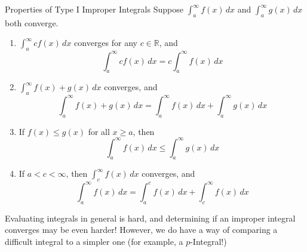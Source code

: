 \begin{Theorem}{Properties of Type I Improper Integrals}{}
    Suppose $ \int_{a}^{\infty} f(x)\, d{x}  $ and $ \int_{a}^{\infty} g(x)\, d{x}  $
    both converge.
    \begin{enumerate}[label=(\arabic*)]
        \item $ \int_{a}^{\infty} cf(x)\, d{x} $
              converges for any $ c\in\mathbb{R} $, and
              \[ \int_{a}^{\infty} cf(x)\, d{x} =c \int_{a}^{\infty} f(x)\, d{x} \]
        \item $ \int_{a}^{\infty} f(x)+g(x)\, d{x} $
              converges, and
              \[ \int_{a}^{\infty} f(x)+g(x)\, d{x}=
                  \int_{a}^{\infty} f(x)\, d{x} +\int_{a}^{\infty} g(x)\, d{x} \]
        \item If $ f(x)\leqslant g(x) $ for all $ x\geqslant a $, then
              \[ \int_{a}^{\infty} f(x)\, d{x} \leqslant \int_{a}^{\infty} g(x)\, d{x} \]
        \item If $ a<c<\infty $, then $ \int_{c}^{\infty} f(x)\, d{x} $ converges, and
              \[ \int_{a}^{\infty} f(x)\, d{x}=
                  \int_{a}^{c} f(x)\, d{x} +\int_{c}^{\infty} f(x)\, d{x} \]
    \end{enumerate}
\end{Theorem}
Evaluating integrals in general is hard, and determining if an improper integral converges
may be even harder! However, we do have a way of comparing a difficult
integral to a simpler one (for example, a $ p $-Integral!)
